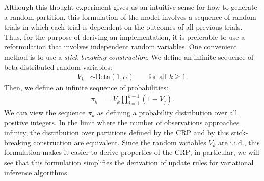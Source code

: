 \documentclass{article}
\begin{document}
Although this thought experiment gives us an intuitive sense for how to generate a random partition, this formulation of the model involves a sequence of random trials in which each trial is dependent on the outcomes of all previous trials.
Thus, for the purpose of deriving an implementation, it is preferable to use a reformulation that involves independent random variables.
One convenient method is to use a \emph{stick-breaking construction}.
We define an infinite sequence of beta-distributed random variables:
\begin{align}
V_k &\sim \text{Beta}(1, \alpha) \qquad \text{for all $k \geq 1$}.
\end{align}
Then, we define an infinite sequence of probabilities:
\begin{align}
\pi_k &= V_k \prod_{j=1}^{k-1} (1-V_j).
\label{eq:pi_crp}
\end{align}
We can view the sequence $\pi_k$ as defining a probability distribution over all positive integers.
In the limit where the number of observations approaches infinity, the distribution over partitions defined by the CRP and by this stick-breaking construction are equivalent.
Since the random variables $V_k$ are i.i.d., this formulation makes it easier to derive properties of the CRP; in particular, we will see that this formulation simplifies the derivation of update rules for variational inference algorithms.
\end{document}
